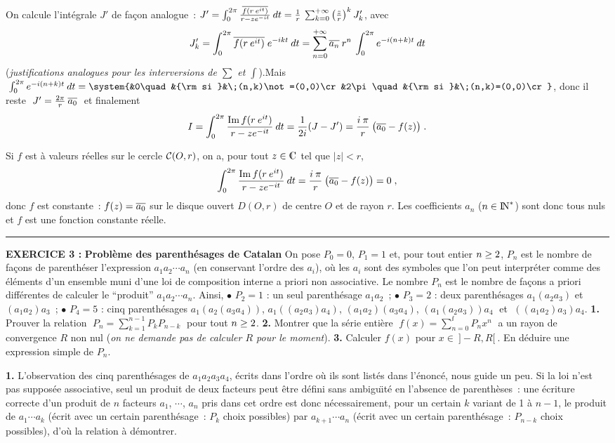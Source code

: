 \documentclass{article}
\begin{document}
\ssk
On calcule l'int\'egrale $J'$ de fa\c con analogue~: $J'=\int_0^{2\pi}{\overline{f(r\>e^{it})}\over r-ze^{-it}}\>dt={1\over r}\>\sum_{k=0}^{+\infty}\left({z\over r}\right)^kJ'_k$, avec
$$J'_k=\int_0^{2\pi}\overline{f(r\>e^{it})}\;e^{-ikt}\>dt = \sum_{n=0}^{+\infty}\overline{a_n}\>r^n\>\int_0^{2\pi}e^{-i(n+k)t}\>dt$$
({\it justifications analogues pour les interversions de $\sum$ et $\int$}).\new Mais $\;\int_0^{2\pi}e^{-i(n+k)t}\>dt=\system{&0\quad&{\rm si }&\;(n,k)\not=(0,0)\cr
&2\pi\quad&{\rm si }&\;(n,k)=(0,0)\cr}$, donc il reste $\;J'={2\pi\over r}\>\overline{a_0}\;$ et finalement
$$I=\int_0^{2\pi}{\mathop{\rm Im}\nolimits f(r\>e^{it})\over r-ze^{-it}}\>dt={1\over 2i}(J-J')={i\>\pi\over r}\>\big(\overline{a_0}-f(z)\big)\;.$$

Si $f$ est \`a  valeurs r\'eelles sur  le cercle ${\cal C}(O,r)$, on a, pour tout $z\in\cmat$ tel que $|z|<r$,\vv
$$\int_0^{2\pi}{\mathop{\rm Im}\nolimits f(r\>e^{it})\over r-ze^{-it}}\>dt={i\>\pi\over r}\>\big(\overline{a_0}-f(z)\big)=0\;,$$
donc $f$ est constante~: $f(z)=\overline{a_0}$ sur le disque ouvert $D(O,r)$ de centre $O$ et de rayon $r$. Les coefficients $a_n$ ($n\in{\rm I\kern-0.5mm N}^*$) sont donc tous nuls et $f$ est une fonction constante r\'eelle. 


\bsk
\hrule
\bsk

{\bf EXERCICE 3 :}\msk
{\bf Probl\`eme des parenth\'esages de Catalan}\msk
On pose $P_0=0$, $P_1=1$ et, pour tout entier $n\geq2$, $P_n$ est le nombre de fa\c cons de parenth\'eser l'expression $a_1a_2\cdots a_n$ (en conservant l'ordre des $a_i$), o\`u  les $a_i$ sont des symboles que l'on peut interpr\'eter comme des \'el\'ements d'un ensemble muni d'une loi de composition interne a priori non associative. Le nombre $P_n$ est le nombre de fa\c cons a priori diff\'erentes de calculer le ``produit'' $a_1a_2\cdots a_n$.
Ainsi,\ssk\sect
$\bullet$ $P_2=1$ : un seul parenth\'esage $a_1a_2$~;\ssk\sect
$\bullet$ $P_3=2$ : deux parenth\'esages $a_1(a_2a_3)$ et $(a_1a_2)a_3$~;\ssk\sect
$\bullet$ $P_4=5$ : cinq parenth\'esages $a_1(a_2(a_3a_4))$, $a_1((a_2a_3)a_4)$, $(a_1a_2)(a_3a_4)$, $(a_1(a_2a_3))a_4\;$ et $\;((a_1a_2)a_3)a_4$.\msk
{\bf 1.} Prouver la relation $\;P_n=\sum_{k=1}^{n-1}P_kP_{n-k}\;$ pour tout $n\geq 2$.\msk
{\bf 2.} Montrer que la s\'erie enti\`ere $\;f(x)=\sum_{n=0}^{\ii}P_nx^n\;$ a un rayon de convergence $R$ non nul ({\it on ne demande pas de calculer $R$ pour le moment}).\msk
{\bf 3.} Calculer $f(x)$ pour $x\in\>]-R,R[\>$. En d\'eduire une expression simple de $P_n$.


\msk
\cl{- - - - - - - - - - - - - - - - - - - - - - - - - - - - - - -}
\msk

{\bf 1.}  L'observation des cinq parenth\'esages de $a_1a_2a_3a_4$, \'ecrits dans l'ordre o\`u ils sont list\'es dans l'\'enonc\'e, nous guide un peu. Si la loi n'est pas suppos\'ee associative, seul un produit de deux facteurs peut \^etre d\'efini sans ambigu\"\i t\'e en l'absence de parenth\`eses~: une \'ecriture correcte d'un produit de $n$ facteurs $a_1$, $\cdots$, $a_n$ pris dans cet ordre est donc n\'ecessairement, pour un certain $k$ variant de 1 \`a $n-1$, le produit de $a_1\cdots a_k$ (\'ecrit avec un certain parenth\'esage~: $P_k$ choix possibles) par $a_{k+1}\cdots a_n$ (\'ecrit avec un certain parenth\'esage~: $P_{n-k}$ choix possibles), d'o\`u la relation \`a d\'emontrer.
\end{document}

